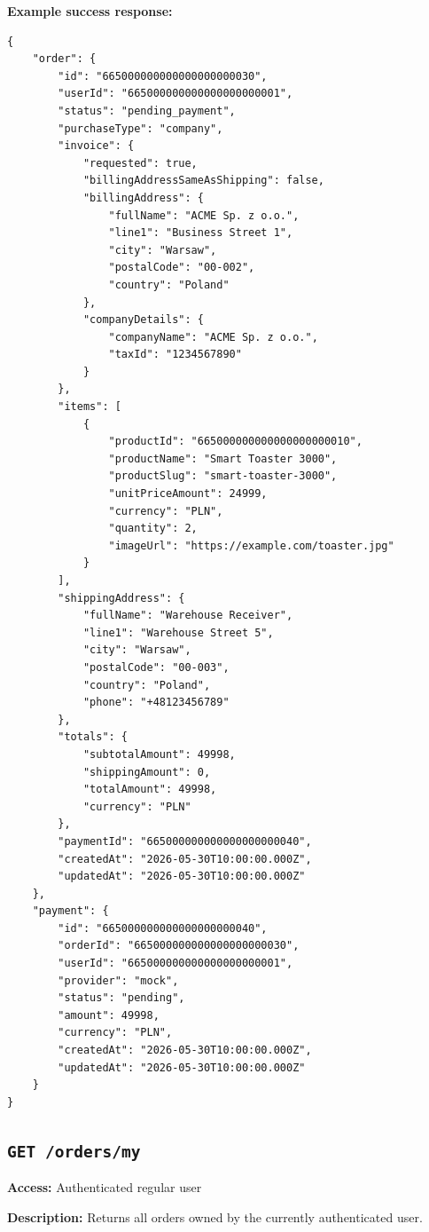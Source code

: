 \pagebreak
\textbf{Example success response:}

\begin{verbatim}
{
    "order": {
        "id": "665000000000000000000030",
        "userId": "665000000000000000000001",
        "status": "pending_payment",
        "purchaseType": "company",
        "invoice": {
            "requested": true,
            "billingAddressSameAsShipping": false,
            "billingAddress": {
                "fullName": "ACME Sp. z o.o.",
                "line1": "Business Street 1",
                "city": "Warsaw",
                "postalCode": "00-002",
                "country": "Poland"
            },
            "companyDetails": {
                "companyName": "ACME Sp. z o.o.",
                "taxId": "1234567890"
            }
        },
        "items": [
            {
                "productId": "665000000000000000000010",
                "productName": "Smart Toaster 3000",
                "productSlug": "smart-toaster-3000",
                "unitPriceAmount": 24999,
                "currency": "PLN",
                "quantity": 2,
                "imageUrl": "https://example.com/toaster.jpg"
            }
        ],
        "shippingAddress": {
            "fullName": "Warehouse Receiver",
            "line1": "Warehouse Street 5",
            "city": "Warsaw",
            "postalCode": "00-003",
            "country": "Poland",
            "phone": "+48123456789"
        },
        "totals": {
            "subtotalAmount": 49998,
            "shippingAmount": 0,
            "totalAmount": 49998,
            "currency": "PLN"
        },
        "paymentId": "665000000000000000000040",
        "createdAt": "2026-05-30T10:00:00.000Z",
        "updatedAt": "2026-05-30T10:00:00.000Z"
    },
    "payment": {
        "id": "665000000000000000000040",
        "orderId": "665000000000000000000030",
        "userId": "665000000000000000000001",
        "provider": "mock",
        "status": "pending",
        "amount": 49998,
        "currency": "PLN",
        "createdAt": "2026-05-30T10:00:00.000Z",
        "updatedAt": "2026-05-30T10:00:00.000Z"
    }
}
\end{verbatim}

\subsection{\texttt{GET /orders/my}}

\textbf{Access:} Authenticated regular user

\textbf{Description:} Returns all orders owned by the currently authenticated user.

